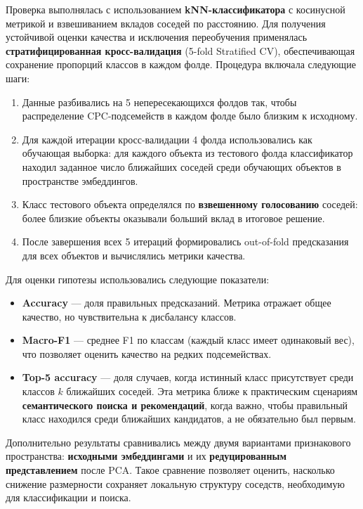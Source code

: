 \documentclass{article}
\begin{document}
Проверка выполнялась с использованием \textbf{kNN-классификатора} с косинусной метрикой и взвешиванием вкладов соседей по расстоянию. Для получения устойчивой оценки качества и исключения переобучения применялась \textbf{стратифицированная кросс-валидация} (5-fold Stratified CV), обеспечивающая сохранение пропорций классов в каждом фолде. Процедура включала следующие шаги:
\begin{enumerate}
  \item Данные разбивались на 5 непересекающихся фолдов так, чтобы распределение CPC-подсемейств в каждом фолде было близким к исходному.
  \item Для каждой итерации кросс-валидации 4 фолда использовались как обучающая выборка: для каждого объекта из тестового фолда классификатор находил заданное число ближайших соседей среди обучающих объектов в пространстве эмбеддингов.
  \item Класс тестового объекта определялся по \textbf{взвешенному голосованию} соседей: более близкие объекты оказывали больший вклад в итоговое решение.
  \item После завершения всех 5 итераций формировались out-of-fold предсказания для всех объектов и вычислялись метрики качества.
\end{enumerate}

Для оценки гипотезы использовались следующие показатели:
\begin{itemize}
  \item \textbf{Accuracy} --- доля правильных предсказаний. Метрика отражает общее качество, но чувствительна к дисбалансу классов.
  \item \textbf{Macro-F1} --- среднее F1 по классам (каждый класс имеет одинаковый вес), что позволяет оценить качество на редких подсемействах.
  \item \textbf{Top-5 accuracy} --- доля случаев, когда истинный класс присутствует среди классов $k$ ближайших соседей. Эта метрика ближе к практическим сценариям \textbf{семантического поиска и рекомендаций}, когда важно, чтобы правильный класс находился среди ближайших кандидатов, а не обязательно был первым.
\end{itemize}

Дополнительно результаты сравнивались между двумя вариантами признакового пространства: \textbf{исходными эмбеддингами} и их \textbf{редуцированным представлением} после PCA. Такое сравнение позволяет оценить, насколько снижение размерности сохраняет локальную структуру соседств, необходимую для классификации и поиска.
\end{document}
